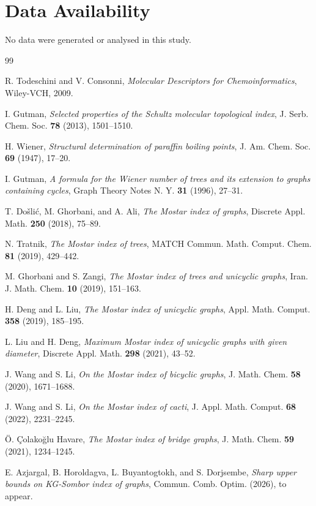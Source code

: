 \documentclass[12pt,a4paper]{article}
\theoremstyle{definition}
\begin{document}
\section*{Data Availability}
No data were generated or analysed in this study.

\begin{thebibliography}{99}

 R. Todeschini and V. Consonni, \emph{Molecular Descriptors for Chemoinformatics}, Wiley-VCH, 2009.

 I. Gutman, \emph{Selected properties of the Schultz molecular topological index}, J. Serb. Chem. Soc. \textbf{78} (2013), 1501–1510.

 H. Wiener, \emph{Structural determination of paraffin boiling points}, J. Am. Chem. Soc. \textbf{69} (1947), 17–20.

 I. Gutman, \emph{A formula for the Wiener number of trees and its extension to graphs containing cycles}, Graph Theory Notes N. Y. \textbf{31} (1996), 27–31.

 T. Došlić, M. Ghorbani, and A. Ali, \emph{The Mostar index of graphs}, Discrete Appl. Math. \textbf{250} (2018), 75–89.

 N. Tratnik, \emph{The Mostar index of trees}, MATCH Commun. Math. Comput. Chem. \textbf{81} (2019), 429–442.

 M. Ghorbani and S. Zangi, \emph{The Mostar index of trees and unicyclic graphs}, Iran. J. Math. Chem. \textbf{10} (2019), 151–163.

 H. Deng and L. Liu, \emph{The Mostar index of unicyclic graphs}, Appl. Math. Comput. \textbf{358} (2019), 185–195.

 L. Liu and H. Deng, \emph{Maximum Mostar index of unicyclic graphs with given diameter}, Discrete Appl. Math. \textbf{298} (2021), 43–52.

 J. Wang and S. Li, \emph{On the Mostar index of bicyclic graphs}, J. Math. Chem. \textbf{58} (2020), 1671–1688.

 J. Wang and S. Li, \emph{On the Mostar index of cacti}, J. Appl. Math. Comput. \textbf{68} (2022), 2231–2245.

 Ö. Çolakoğlu Havare, \emph{The Mostar index of bridge graphs}, J. Math. Chem. \textbf{59} (2021), 1234–1245.

 E. Azjargal, B. Horoldagva, L. Buyantogtokh, and S. Dorjsembe, \emph{Sharp upper bounds on KG‑Sombor index of graphs}, Commun. Comb. Optim. (2026), to appear.

\end{thebibliography}
\end{document}
